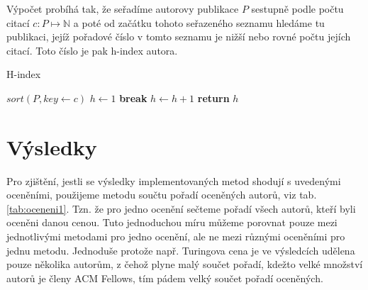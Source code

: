 \documentclass{bakalarka}
\begin{document}
Výpočet probíhá tak, že seřadíme autorovy publikace $P$ sestupně podle počtu
citací $c: P \mapsto \mathbb{N}$ a poté od začátku tohoto seřazeného seznamu
hledáme tu publikaci, jejíž pořadové číslo v tomto seznamu je nižší nebo rovné
počtu jejích citací. Toto číslo je pak h-index autora.
\begin{center}
\begin{minipage}{\textwidth}
\begin{algorithm}[H]
	\caption{H-index}
		\label{alg:hindex}

	\begin{algorithmic}[1]
	\Statex
		\State $sort(P, key \gets c)$
		\State $h \gets 1$
				\State \textbf{break}
			\EndIf
			\State $h \gets h + 1$
		\EndFor
		\State \textbf{return} $h$
	\EndFunction
	\end{algorithmic}
\end{algorithm}
\end{minipage}
\end{center}
\mbox{}








\chapter{Výsledky}
Pro zjištění, jestli se výsledky implementovaných metod shodují s uvedenými
oceněními, použijeme metodu součtu pořadí oceněných autorů, viz tab.
\ref{tab:oceneni1}. Tzn. že pro jedno ocenění sečteme pořadí všech autorů,
kteří byli oceněni danou cenou. Tuto jednoduchou míru můžeme porovnat pouze
mezi jednotlivými metodami pro jedno ocenění, ale ne mezi různými oceněními pro
jednu metodu. Jednoduše protože např. Turingova cena je ve výsledcích udělena
pouze několika autorům, z čehož plyne malý součet pořadí, kdežto velké množství
autorů je členy ACM Fellows, tím pádem velký součet pořadí oceněných.
\end{document}
